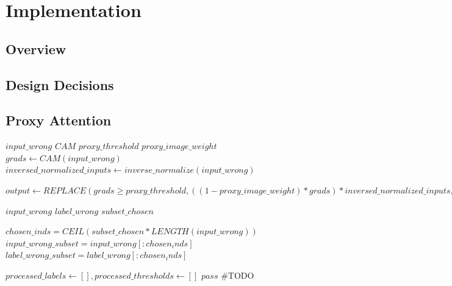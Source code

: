 
\chapter{Implementation}

\section{Overview}
\section{Design Decisions}

\section{Proxy Attention}

\begin{algorithm}
    \caption{Single Batch Proxy Attention}
    \label{alg:proxy_attention_single_batch}
    \begin{algorithmic}
        \REQUIRE $input\_wrong$
        \REQUIRE $CAM$
        \REQUIRE $proxy\_threshold$
        \REQUIRE $proxy\_image\_weight$
        \STATE $grads \leftarrow CAM(input\_wrong)$
        \STATE $inversed\_normalized\_inputs \leftarrow inverse\_normalize(input\_wrong)$

        \STATE $output \leftarrow REPLACE(grads \geq proxy\_threshold, ((1- proxy\_image\_weight) * grads) * inversed\_normalized\_inputs, inversed\_normalized\_inputs)$
    \end{algorithmic}
\end{algorithm}


\begin{algorithm}
    \caption{Batch Proxy Attention}
    \label{alg:proxy_attention_batch}
    \begin{algorithmic}
        \REQUIRE $input\_wrong$
        \REQUIRE $label\_wrong$
        \REQUIRE $subset\_chosen$

        \STATE $chosen\_inds = CEIL(subset\_chosen * LENGTH(input\_wrong))$
        \STATE $input\_wrong\_subset = input\_wrong[:chosen_inds]$
        \STATE $label\_wrong\_subset = label\_wrong[:chosen_inds]$

        \STATE $processed\_labels \leftarrow [], processed\_thresholds \leftarrow []$
        \STATE $pass$ \#TODO
        \ENDFOR

    \end{algorithmic}
\end{algorithm}

